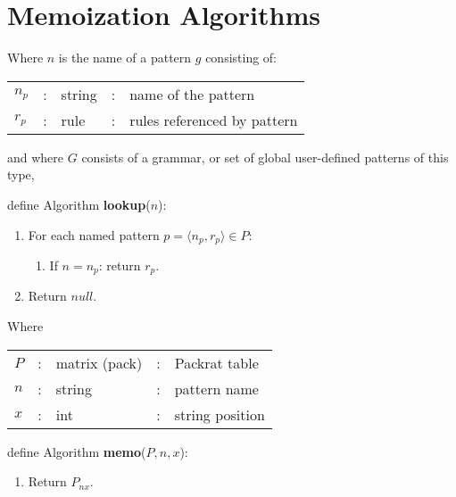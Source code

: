 \section{Memoization Algorithms}

 \begin{framed}

  Where $n$ is the name of a pattern $g$ consisting of:

  \begin{center}
   \begin{tabular}{lclcl}
    $n_p$ & : & string  & : & name of the pattern         \\
    $r_p$ & : & rule    & : & rules referenced by pattern \\
   \end{tabular}
  \end{center}

 and where ${G}$ consists of a grammar, or set of global user-defined patterns
 of this type,

 \vspace{12pt}

 define Algorithm \textbf{lookup}($n$):
 
  \begin{enumerate}
    \item For each named pattern $p = \langle n_p, r_p \rangle \in {P}$:
    \begin{enumerate} 
      \item If $n = n_p$: return $r_p$.
    \end{enumerate} 
    \item Return $null$.
  \end{enumerate} 

 \end{framed}


 \begin{framed}
  Where

  \begin{center}
   \begin{tabular}{lclcl}
    $P$ & : & matrix (pack)   & : & Packrat table \\
    $n$ & : & string          & : & pattern name \\
    $x$ & : & int             & : & string position \\
   \end{tabular}
  \end{center}

 define Algorithm \textbf{memo}($P, n, x$):
 
  \begin{enumerate}
   \item Return $P_{nx}$.
  \end{enumerate}
 \end{framed}


